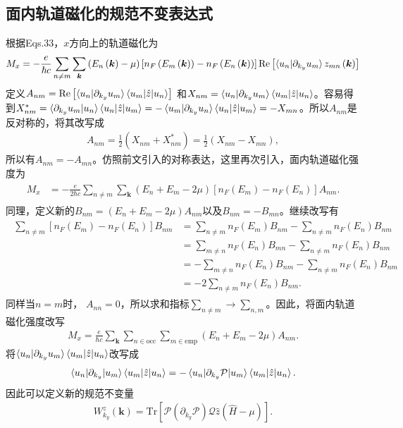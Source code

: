 \documentclass[10pt, oneside]{article}
\newcommand{\pa}{\partial}
\newcommand{\mr}[1]{\mathrm{#1}}
\newcommand{\p}[1]{\left(#1\right)}
\newcommand{\bb}[1]{\left[#1\right]}
\begin{document}
\subsection{面内轨道磁化的规范不变表达式}
根据Eqs.33，\(x\)方向上的轨道磁化为
\begin{align*}
	M_x = -\frac{e}{\hbar c} \sum_{n \neq m} \sum_{\bm{k}} \p{E_n \p{\bm{k}} - \mu} \bb{n_{F} \p{E_m \p{\bm{k}}   } - n_{F} \p{E_n \p{\bm{k}} }} \mr{Re} \bb{\braket{u_n | \pa_{k_y} u_m} z_{mn} \p{\bm{k}}  }
\end{align*}
定义\(A_{nm} = \mr{Re} \bb{\braket{u_n | \pa_{k_y}u_m  }  \braket{u_m | \hat{z} |u_n}}\) 和\(X_{nm} = \braket{u_n | \pa_{k_y}u_m  }  \braket{u_m | \hat{z} |u_n}\)。容易得到\(X^{*}_{nm} = \braket{\pa_{k_y} u_m | u_n} \braket{u_n | \hat{z} | u_m} = - \braket{u_m | \pa_{k_y} u_n } \braket{u_n | \hat{z} | u_m}= - X_{mn}\)。所以\(A_{nm}\)是反对称的，将其改写成
\begin{align}
	A_{nm} = \frac{1}{2} \p{X_{nm} + X^{*}_{nm}} = \frac{1}{2} \p{X_{nm} - X_{mn}},
\end{align}
所以有\(A_{nm} = -A_{mn}\)。仿照前文引入的对称表达，这里再次引入，面内轨道磁化强度为
\begin{align}
	\begin{split}
		M_x & = - \frac{e}{2 \hbar c} \sum_{n \neq m} \sum_{\bm{k}} \p{E_n +E_m - 2 \mu} \bb{n_{F} \p{E_m} - n_{F} \p{E_{n}}} A_{nm}.
	\end{split}
\end{align}
同理，定义新的\(B_{nm} =  \p{E_n +E_m - 2 \mu} A_{nm}\)以及\(B_{nm} = - B_{mn}\)。继续改写有
\begin{align}
	\begin{split}
		\sum_{n \neq m}  \bb{n_{F} \p{E_m} - n_{F} \p{E_{n}}} B_{nm} &= \sum_{n \neq m} n_{F} \p{E_m} B_{nm} - \sum_{n \neq m} n_{F} \p{E_n} B_{nm} \\
		& = \sum_{m \neq n} n_{F} \p{E_n} B_{mn} - \sum_{n \neq m} n_{F} \p{E_n} B_{nm} \\
		& = - \sum_{m \neq n} n_F \p{E_n} B_{nm} - \sum_{n \neq m} n_{F} \p{E_n} B_{nm}  \\
		& = - 2 \sum_{n \neq m} n_F \p{E_n} B_{nm}.
	\end{split}
\end{align}
同样当\(n = m\)时， \(A_{nn} = 0\)，所以求和指标\(\sum_{n \neq m} \rightarrow \sum_{n,m}\)。因此，将面内轨道磁化强度改写
\begin{align}
	M_{x} = \frac{e}{ \hbar c} \sum_{\bm{k} } \sum_{n \in \mr{occ}} \sum_{m \in \mr{emp}} \p{E_n +E_m - 2 \mu} A_{nm}.
\end{align}
将\(\braket{u_n | \pa_{k_y}u_m  }  \braket{u_m | \hat{z} |u_n}\)改写成
\begin{align}
	\begin{split}
		\braket{u_n | \pa_{k_y} | u_m} \braket{u_m | \hat{z} |u_n} = -\braket{u_n | \pa_{k_y} \mathcal{P} |u_m} \braket{u_m | \hat{z} |u_n}.
	\end{split}
\end{align}
因此可以定义新的规范不变量
\begin{align}
		\boxed{
			W^{z}_{k_y} \p{\bm{k}} = \mr{Tr} \bb{\mathcal{P} \p{\pa_{k_y} \mathcal{P}} \mathcal{Q} \hat{z}  \p{\hat{H} - \mu}} 
		}.
\end{align}
\end{document}
